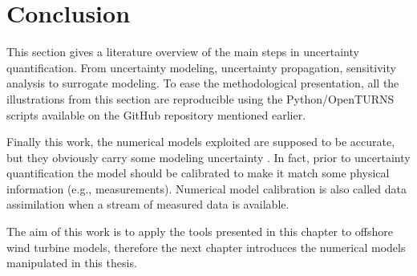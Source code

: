 \section{Conclusion}

This section gives a literature overview of the main steps in uncertainty quantification. 
From uncertainty modeling, uncertainty propagation, sensitivity analysis to surrogate modeling. 
To ease the methodological presentation, all the illustrations from this section are reproducible using the Python/OpenTURNS scripts available on the GitHub repository mentioned earlier. 

Finally this work, the numerical models exploited are supposed to be accurate, but they obviously carry some modeling uncertainty \citep{oberkampf_2010_VVUQ}. 
In fact, prior to uncertainty quantification the model should be calibrated to make it match some physical information (e.g., measurements). 
Numerical model calibration is also called data assimilation when a stream of measured data is available. 

The aim of this work is to apply the tools presented in this chapter to offshore wind turbine models, therefore the next chapter introduces the numerical models manipulated in this thesis.  

